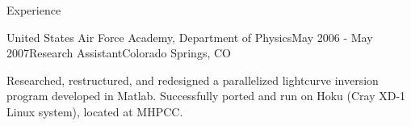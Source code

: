 \begin{rSection}{Experience}
\begin{rSubsection}{United States Air Force Academy, Department of Physics}{May 2006 - May 2007}{Research Assistant}{Colorado Springs, CO}
\item Researched, restructured, and redesigned a parallelized lightcurve inversion program developed in Matlab.
Successfully ported and run on Hoku (Cray XD-1 Linux system), located at MHPCC.
\end{rSubsection}


\end{rSection}
